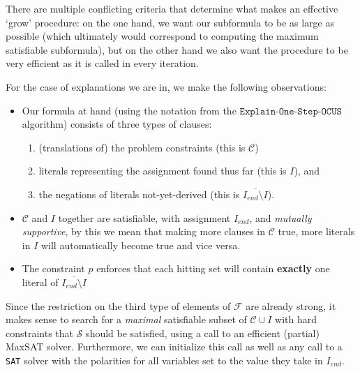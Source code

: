 \documentclass[a4paper,UKenglish,cleveref, autoref, thm-restate, pdfa]{lipics-v2021}
\newcommand\m[1]{\mathcal{#1}}
\newcommand\F{\ensuremath{\m{F} }\xspace}
\newcommand\Iend{\ensuremath{I_\mathit{end} }\xspace}
\newcommand\formula{\ensuremath{\m{F} }\xspace}
\newcommand\formulac{\ensuremath{\m{C} }\xspace}
\newcommand\mm[1]{\ensuremath{#1}\xspace}
\newcommand\call[1]{\mm{\texttt{#1}}}
\newcommand\sat{\texttt{{SAT}}\xspace}
\newcommand\grow{\mm{\call{Grow}}}
\newcommand\maxsat{MaxSAT\xspace}
\newcommand\onestepo{\ensuremath{\call{Explain-One-Step-OCUS}}\xspace}
\begin{document}
	There are multiple conflicting criteria that determine what makes an effective `grow' procedure:
	on the one hand, we want our subformula to be as large as possible (which ultimately would correspond to computing the maximum satisfiable subformula), %
	but on the other hand we also want the procedure to be very efficient as it is called in every iteration. 
	
	For the case of explanations we are in, we make the following observations: 
	\begin{itemize}
		\item Our formula at hand (using the notation from the \onestepo algorithm) consists of three types of clauses: 
		\begin{enumerate}%
			\item (translations of) the problem constraints (this is \formulac) 
			\item literals representing the assignment found thus far (this is $I$), and 
			\item the negations of literals not-yet-derived (this is $\overline{\Iend\setminus I}$). 
		\end{enumerate}
		\item $\formulac$ and $I$ together are satisfiable, with assignment $I_{end}$, and \emph{mutually supportive}, by this we mean that making more clauses in \formulac true, more literals in $I$ will automatically become true and vice versa. 
		\item The constraint $p$ enforces that each hitting set will contain \textbf{exactly} one literal of  $\overline{\Iend\setminus I}$
	\end{itemize}
	
	Since the restriction on the third type of elements of $\formula$ are already strong, it makes sense %
	to search for a \emph{maximal} satisfiable subset of $\formulac\cup I$ with hard constraints that $\m{S}$ should be satisfied, using a call to an efficient (partial) \maxsat solver. 
	Furthermore, we can initialize this call as well as any call to a \sat solver with the polarities for all variables set to the value they take in $\Iend$. 
	
\end{document}
